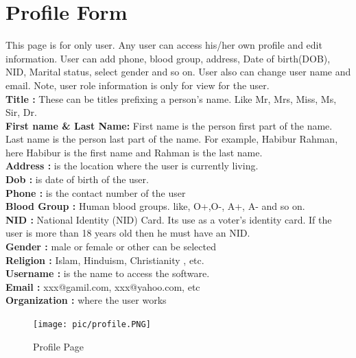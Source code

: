 \documentclass[12pt]{report} %
\begin{document}
\section{Profile Form}
This page is for only user. Any user can access his/her own profile and edit information. User can add phone, blood group, address, Date of birth(DOB), NID, Marital status, select gender and so on. User also can change user name and email. Note, user role information is only for view for the user.\\
\textbf{Title : } These can be titles prefixing a person's name. Like Mr, Mrs, Miss, Ms, Sir, Dr.\\
\textbf{First name \& Last Name: }First name is the person first part of the name. Last name is the person last part of the name. For example, Habibur Rahman, here Habibur is the first name and Rahman is the last name.\\
\textbf{Address :} is the location where the user is currently living.\\
\textbf{Dob :} is date of birth of the user.\\
\textbf{Phone :} is the contact number of the user\\
\textbf{Blood Group :} Human blood groups.  like, O+,O-, A+, A- and so on.\\
\textbf{NID :} National Identity (NID) Card. Its use as a voter's identity card. If the user is more than 18 years old then he must have an NID.\\
\textbf{Gender :} male or female or other can be selected\\
\textbf{Religion :} Islam, Hinduism, Christianity , etc.\\
\textbf{Username :} is the name to access the software.\\
\textbf{Email :} xxx@gamil.com, xxx@yahoo.com, etc\\
\textbf{Organization :} where the user works\\
\clearpage


\begin{figure}[h]
	\begin{center}
	\texttt{[image: pic/profile.PNG]}
	\end{center}
	\caption{Profile Page}
	\label{fig:profile}
\end{figure}
\end{document}
